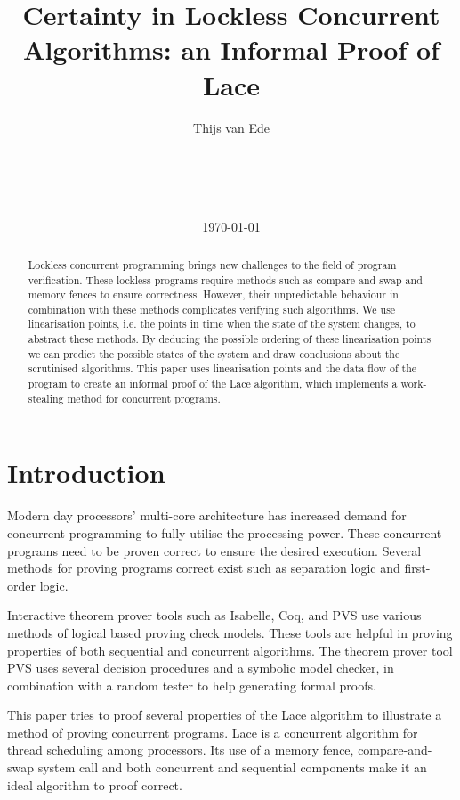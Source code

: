 \documentclass{sig-alternate-br}
\title{Certainty in Lockless Concurrent Algorithms: an Informal Proof of Lace}
\author{
	\alignauthor
	Thijs van Ede\\
	\affaddr{University of Twente}\\
	\affaddr{P.O. Box 217, 7500AE Enschede}\\
	\affaddr{The Netherlands}\\
	\affaddr{t.s.vanede@student.utwente.nl}\\
}
\date{\today}
\begin{document}
\maketitle

\begin{abstract}
Lockless concurrent programming brings new challenges to the field of program verification.
These lockless programs require methods such as compare-and-swap and memory fences to ensure correctness.
However, their unpredictable behaviour in combination with these methods complicates verifying such algorithms.
We use linearisation points, i.e. the points in time when the state of the system changes, to abstract these methods.
By deducing the possible ordering of these linearisation points we can predict the possible states of the system and draw conclusions about the scrutinised algorithms.
This paper uses linearisation points and the data flow of the program to create an informal proof of the Lace\cite{vanDijk2014206} algorithm, which implements a work-stealing method for concurrent programs.
\end{abstract}


\section{Introduction}
Modern day processors' multi-core architecture has increased demand for concurrent programming to fully utilise the processing power.
These concurrent programs need to be proven correct to ensure the desired execution.
Several methods for proving programs correct exist such as separation logic\cite{reynolds2002} and first-order logic\cite{smullyan1995}.

Interactive theorem prover tools such as Isabelle\cite{paulson1994isabelle}, Coq\cite{coq2015}, and PVS\cite{owre1992pvs} use various methods of logical based proving check models.
These tools are helpful in proving properties of both sequential\cite{badban2005verification} and concurrent\cite{colvin2006formal} \cite{shankar1993verification} algorithms.
The theorem prover tool PVS uses several decision procedures and a symbolic model checker, in combination with a random tester to help generating formal proofs.

This paper tries to proof several properties of the Lace algorithm\cite{vanDijk2014206} to illustrate a method of proving concurrent programs.
Lace is a concurrent algorithm for thread scheduling among processors.
Its use of a memory fence, compare-and-swap system call and both concurrent and sequential components make it an ideal algorithm to proof correct.
\end{document}
